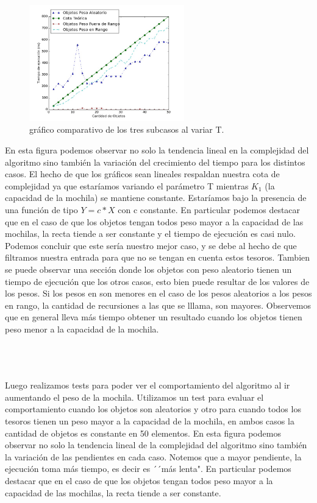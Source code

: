 \documentclass[spanish,12pt]{article}
\begin{document}
{\begin{figure}[H]
\centering
\includegraphics[width=0.6\textwidth]{ObjMejorCasoVsAbjRangovsObjAl}
\caption{gráfico comparativo de los tres subcasos al variar T.}
\end{figure}


En esta figura podemos observar no solo la tendencia lineal en la complejidad del algoritmo sino también la variación del crecimiento del tiempo para los distintos casos.
El hecho de que los gráficos sean lineales respaldan nuestra cota de complejidad ya que estaríamos variando el parámetro T mientras $K_1$ (la capacidad de la mochila) se mantiene constante. Estaríamos bajo la presencia de una función de tipo $Y=c*X$ con c constante.
En particular podemos destacar que en el caso de que los objetos tengan todos peso mayor a la capacidad de las mochilas, la recta tiende a ser constante y el tiempo de ejecución es casi nulo.
Podemos concluir que este sería nuestro mejor caso, y se debe al hecho de que filtramos nuestra entrada para que no se tengan en cuenta estos tesoros.
Tambien se puede observar una sección donde los objetos con peso aleatorio tienen un tiempo de ejecución que los otros casos, esto bien puede resultar de los valores de los pesos. Si los pesos en son menores en el caso de los pesos aleatorios a los pesos en rango, la cantidad de recursiones a las que se lllama, son mayores. 
Observemos que en general lleva más tiempo obtener un resultado cuando los objetos tienen peso menor a la capacidad de la mochila.

\\
\\
\\
Luego realizamos tests para poder ver el comportamiento del algoritmo al ir aumentando el peso de la mochila. Utilizamos un test para evaluar el comportamiento cuando los objetos son aleatorios y otro para cuando todos los tesoros tienen un peso mayor a la capacidad de la mochila, en ambos casos la cantidad de objetos es constante en 50 elementos.
En esta figura podemos observar no solo la tendencia lineal de la complejidad del algoritmo sino también la variación de las pendientes en cada caso. Notemos que a mayor pendiente, la ejecución toma más tiempo, es decir es ´´más lenta".
En particular podemos destacar que en el caso de que los objetos tengan todos peso mayor a la capacidad de las mochilas, la recta tiende a ser constante.

}
\end{document}
